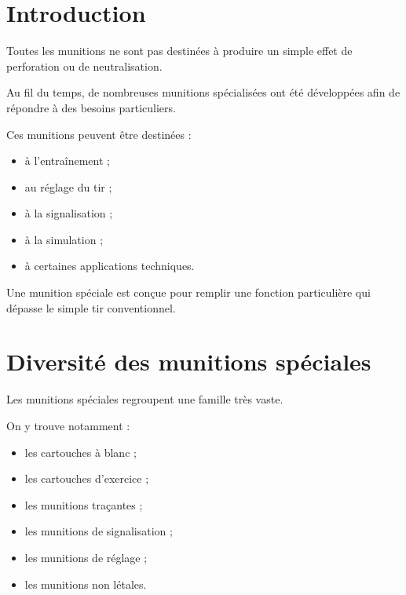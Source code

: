 
\section{Introduction}

Toutes les munitions ne sont pas destinées à produire un simple effet de
perforation ou de neutralisation.

Au fil du temps, de nombreuses munitions spécialisées ont été développées afin
de répondre à des besoins particuliers.

Ces munitions peuvent être destinées :

\begin{itemize}
    \item à l'entraînement ;
    \item au réglage du tir ;
    \item à la signalisation ;
    \item à la simulation ;
    \item à certaines applications techniques.
\end{itemize}

\begin{aretenir}

Une munition spéciale est conçue pour remplir une fonction particulière qui
dépasse le simple tir conventionnel.

\end{aretenir}

\section{Diversité des munitions spéciales}

Les munitions spéciales regroupent une famille très vaste.

On y trouve notamment :

\begin{itemize}
    \item les cartouches à blanc ;
    \item les cartouches d'exercice ;
    \item les munitions traçantes ;
    \item les munitions de signalisation ;
    \item les munitions de réglage ;
    \item les munitions non létales.
\end{itemize}

